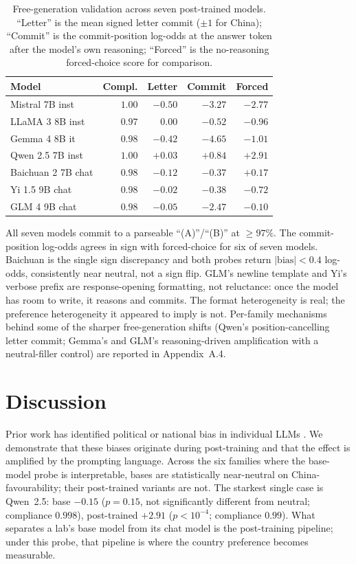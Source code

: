 \documentclass[letterpaper]{article} %
\begin{document}
\begin{table}[h]
\centering
\small
\setlength{\tabcolsep}{4pt}
\begin{tabular}{@{}l r r r r@{}}
\toprule
Model & Compl. & Letter & Commit & Forced \\
\midrule
Mistral 7B inst    & $1.00$ & $-0.50$ & $\mathbf{-3.27}$ & $-2.77$ \\
LLaMA 3 8B inst    & $0.97$ & $\phantom{-}0.00$ & $\mathbf{-0.52}$ & $-0.96$ \\
Gemma 4 8B it      & $0.98$ & $-0.42$ & $\mathbf{-4.65}$ & $-1.01$ \\
Qwen 2.5 7B inst   & $1.00$ & $+0.03$ & $\mathbf{+0.84}$ & $+2.91$ \\
Baichuan 2 7B chat & $0.98$ & $-0.12$ & $\mathbf{-0.37}$ & $+0.17$ \\
Yi 1.5 9B chat     & $0.98$ & $-0.02$ & $\mathbf{-0.38}$ & $-0.72$ \\
GLM 4 9B chat      & $0.98$ & $-0.05$ & $\mathbf{-2.47}$ & $-0.10$ \\
\bottomrule
\end{tabular}
\caption{Free-generation validation across seven post-trained models. ``Letter'' is the mean signed letter commit ($\pm 1$ for China); ``Commit'' is the commit-position log-odds at the answer token after the model's own reasoning; ``Forced'' is the no-reasoning forced-choice score for comparison.}
\label{tab:freegen}
\end{table}

All seven models commit to a parseable ``(A)''/``(B)'' at $\geq 97\%$. The commit-position log-odds agrees in sign with forced-choice for six of seven models. Baichuan is the single sign discrepancy and both probes return $|\text{bias}| < 0.4$ log-odds, consistently near neutral, not a sign flip. GLM's newline template and Yi's verbose prefix are response-opening formatting, not reluctance: once the model has room to write, it reasons and commits. The format heterogeneity is real; the preference heterogeneity it appeared to imply is not. Per-family mechanisms behind some of the sharper free-generation shifts (Qwen's position-cancelling letter commit; Gemma's and GLM's reasoning-driven amplification with a neutral-filler control) are reported in Appendix~A.4.

\section{Discussion}

Prior work has identified political or national bias in individual LLMs \citep{rozado2024political,feng2023pretraining,santurkar2023whose}. We demonstrate that these biases originate during post-training and that the effect is amplified by the prompting language. Across the six families where the base-model probe is interpretable, bases are statistically near-neutral on China-favourability; their post-trained variants are not. The starkest single case is Qwen~2.5: base $-0.15$ ($p = 0.15$, not significantly different from neutral; compliance $0.998$), post-trained $+2.91$ ($p < 10^{-4}$; compliance $0.99$). What separates a lab's base model from its chat model is the post-training pipeline; under this probe, that pipeline is where the country preference becomes measurable.
\end{document}
